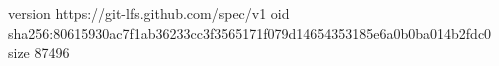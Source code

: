 version https://git-lfs.github.com/spec/v1
oid sha256:80615930ac7f1ab36233cc3f3565171f079d14654353185e6a0b0ba014b2fdc0
size 87496
